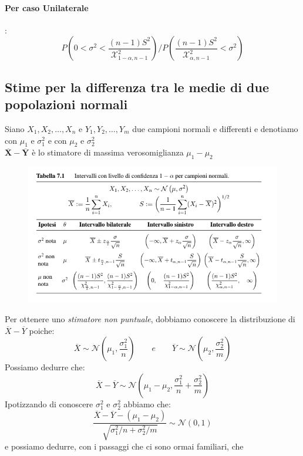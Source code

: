 \documentclass[]{article}
\begin{document}
    \paragraph{Per caso Unilaterale}:
    \begin{equation}
        P \left( 0 < \sigma^2  < \frac{(n-1)S^2}{\mathcal{X}^2_{1-\alpha, n-1}}\right) / P \left( \frac{(n-1)S^2}{\mathcal{X}^2_{\alpha, n-1}} < \sigma^2 \right)
    \end{equation}
    \subsection{Stime per la differenza tra le medie di due popolazioni normali}
    Siano $X_1, X_2, \ldots, X_n$ e $Y_1, Y_2, \ldots, Y_m$ due campioni normali e differenti e denotiamo con $\mu_1$ e $\sigma^2_1$ e con $\mu_2$ e $\sigma^2_2$ \\
    $\boldsymbol{\overline{X} - \overline{Y}}$ è lo stimatore di massima verosomiglianza $\mu_1 - \mu_2$
    \begin{figure}[H]
        \includegraphics[width=\textwidth]{images/boh_2.png}
    \end{figure}
    Per ottenere uno \textit{stimatore non puntuale}, dobbiamo conoscere la distribuzione di $\overline{X} - \overline{Y}$ poiche:
    \[ \overline{X} \sim \mathcal{N} \left( \mu_1, \frac{\sigma^2_1}{n} \right)  \qquad e \qquad \overline{Y} \sim \mathcal{N}\left( \mu_2, \frac{\sigma^2_2}{m} \right) \]
    Possiamo dedurre che:
    \[ \overline{X} - \overline{Y} \sim \mathcal{N}\left( \mu_1 - \mu_2, \frac{\sigma^2_1}{n} + \frac{\sigma^2_2}{m} \right) \]
    Ipotizzando di conoscere $\sigma^2_1$ e $\sigma^2_2$ abbiamo che:
    \[ \frac{\overline{X} - \overline{Y} - (\mu_1 - \mu_2)}{\sqrt{\sigma^2_1 / n + \sigma^2_2 / m}} \sim \mathcal{N}(0,1) \]
    e possiamo dedurre, con i passaggi che ci sono ormai familiari, che
\end{document}
